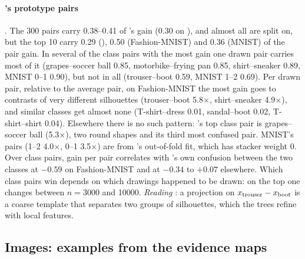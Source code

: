 \paragraph{'s prototype pairs} . The 300 pairs carry 0.38--0.41 of 's gain (0.30 on ), and almost all are split on, but the top 10 carry 0.29 (), 0.50 (Fashion-MNIST) and 0.36 (MNIST) of the pair gain. In several of the class pairs with the most gain one drawn pair carries most of it (grapes--soccer ball 0.85, motorbike--frying pan 0.85, shirt--sneaker 0.89, MNIST 0--1 0.90), but not in all (trouser--boot 0.59, MNIST 1--2 0.69). Per drawn pair, relative to the average pair, on Fashion-MNIST the most gain goes to contrasts of very different silhouettes (trouser--boot 5.8$\times$, shirt--sneaker 4.9$\times$), and similar classes get almost none (T-shirt--dress 0.01, sandal--boot 0.02, T-shirt--shirt 0.04). Elsewhere there is no such pattern: 's top class pair is grapes--soccer ball (5.3$\times$), two round shapes and its third most confused pair. MNIST's pairs (1--2 4.0$\times$, 0--1 3.5$\times$) are from 's out-of-fold fit, which has stacker weight 0. Over class pairs, gain per pair correlates with 's own confusion between the two classes at $-0.59$ on Fashion-MNIST and at $-0.34$ to $+0.07$ elsewhere. Which class pairs win depends on which drawings happened to be drawn: on  the top one changes between $n=3000$ and 10000. \emph{Reading} : a projection on $x_{\rm trouser}-x_{\rm boot}$ is a coarse template that separates two groups of silhouettes, which the trees refine with local features.

\subsection{Images: examples from the evidence maps}\label{app:interp-maps-ex}

